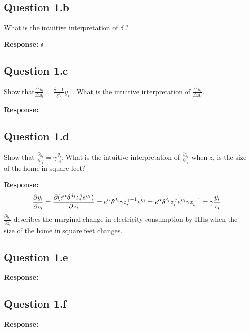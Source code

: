 \documentclass{article}
\begin{document}
\subsection*{Question 1.b} What is the intuitive interpretation of \(\delta\) ? 

\textbf{Response:} 
\(\delta\)


\subsection*{Question 1.c} Show that\(\frac{\triangle y_i}{\triangle d_i} = \frac{\delta -1}{\delta^{d_i}} y_i \) . What is the intuitive interpretation of \(\frac{\triangle y_i}{\triangle d_i} \).

\textbf{Response:} 

\subsection*{Question 1.d} Show that \(\frac{\partial y_i}{\partial z_i} = \gamma \frac{y_i}{z_i}\). What is the intuitive interpretation of \(\frac{\partial y_i}{\partial z_i}\) when \(z_i\) is the size of the home in square feet?

\textbf{Response:} 
\[\frac{\partial y_i}{\partial z_i} = \frac{\partial (e^{\alpha} \delta^{d_i} z_i^\gamma e^{\eta_i})}{\partial z_i} = \\ 
                                       e^{\alpha} \delta^{d_i} \gamma z_i^{\gamma - 1} e^{\eta_i} = \\
                                      e^{\alpha} \delta^{d_i} z_i^\gamma e^{\eta_i} \gamma z_i^{- 1} = \\ 
                                      \gamma \frac{y_i}{z_i} \]
\(\frac{\partial y_i}{\partial z_i}\) describes the marginal change in electricity consumption by HHs when the size of the home in square feet changes. 

\subsection*{Question 1.e}
\textbf{Response:} 


\subsection*{Question 1.f}
\textbf{Response:} 
\end{document}
